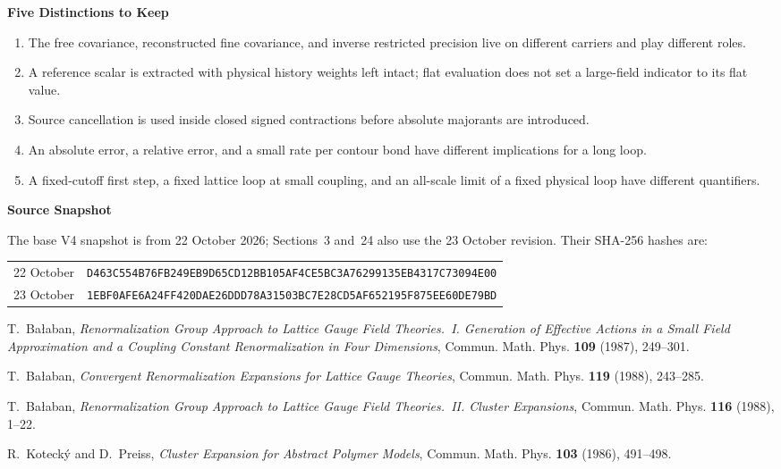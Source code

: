 \documentclass[11pt,a4paper]{article}
\newcommand{\subhead}[1]{\par\vspace{4pt}\textbf{\color{ink}#1}\par}
\begin{document}
\subhead{Five Distinctions to Keep}
\begin{enumerate}
    \item The free covariance, reconstructed fine covariance, and inverse restricted precision live on different carriers and play different roles.
    \item A reference scalar is extracted with physical history weights left intact; flat evaluation does not set a large-field indicator to its flat value.
    \item Source cancellation is used inside closed signed contractions before absolute majorants are introduced.
    \item An absolute error, a relative error, and a small rate per contour bond have different implications for a long loop.
    \item A fixed-cutoff first step, a fixed lattice loop at small coupling, and an all-scale limit of a fixed physical loop have different quantifiers.
\end{enumerate}

\subhead{Source Snapshot}
The base V4 snapshot is from 22 October 2026; Sections~3 and~24 also use the 23 October revision. Their SHA-256 hashes are:

\begin{footnotesize}
\begin{tabular}{@{}ll@{}}
    22 October & \texttt{D463C554B76FB249EB9D65CD12BB105AF4CE5BC3A76299135EB4317C73094E00}\\
    23 October & \texttt{1EBF0AFE6A24FF420DAE26DDD78A31503BC7E28CD5AF652195F875EE60DE79BD}\\
\end{tabular}
\end{footnotesize}

\begin{thebibliography}{9}
    T.~Ba{\l}aban,
    \emph{Renormalization Group Approach to Lattice Gauge Field Theories.~I. Generation of Effective Actions in a Small Field Approximation and a Coupling Constant Renormalization in Four Dimensions},
    Commun. Math. Phys. \textbf{109} (1987), 249--301.

    T.~Ba{\l}aban,
    \emph{Convergent Renormalization Expansions for Lattice Gauge Theories},
    Commun. Math. Phys. \textbf{119} (1988), 243--285.

    T.~Ba{\l}aban,
    \emph{Renormalization Group Approach to Lattice Gauge Field Theories.~II. Cluster Expansions},
    Commun. Math. Phys. \textbf{116} (1988), 1--22.

    R.~Koteck\'y and D.~Preiss,
    \emph{Cluster Expansion for Abstract Polymer Models},
    Commun. Math. Phys. \textbf{103} (1986), 491--498.
\end{thebibliography}
\end{document}
